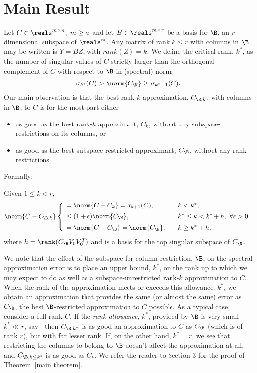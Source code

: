 \section{Main Result}
Let $C \in \reals^{m \times n}, \; m \geq n$ and let $B \in \reals^{m \times r}$ be a basis for $\B$, an $r$-dimensional subspace of $\reals^m$. Any matrix of rank $k \leq r$ with columns in $\B$ may be written is $Y = BZ$, with $rank(Z) = k$. We define the critical rank, $k^*$, as the number of singular values of $C$ strictly larger than the orthogonal complement of $C$ with respect to $\B$ in (spectral) norm:
\begin{eqnarray}\label{critical rank inequality}
\sigma_{k^*}(C) > \norm{C_{\N}} \geq \sigma_{k^*+1}(C).
\end{eqnarray}
Our main observation is that the best rank-$k$ approximation, $C_{\B, k}$, with columns in $\B$, to $C$ is for the most part either
\begin{itemize}
\item as good as the best rank-$k$ approximant, $C_k$, without any subspace-restrictions on its columns, or
\item as good as the best subspace restricted approximant, $C_{\B}$, without any rank restrictions.
\end{itemize}
Formally:
\begin{theorem}\label{main theorem}
Given $1 \leq k < r,$
\[ \norm{C - C_{\B,k}}  \left\{ \begin{array}{ll} = \norm{C - C_k} = \sigma_{k+1}(C), & \quad k < k^*,\\
[5 pt] \leq (1+\epsilon)\norm{C_{\N}}, & \quad k^* \leq k < k^*+h, \text{ } \forall \epsilon > 0 \\
[5 pt] = \norm{C - C_{\B}} = \norm{C_{\N}}, & \quad k \geq k^*+h,  \end{array} \right. \]
where $h=\rank(C_{\B} V_0V_0^T)$ 
and  is a basis for the top singular subspace of $C_{\N}$.
\end{theorem}

\noindent We note that the effect of the subspace for column-restriction, $\B$, on the spectral approximation error is to place an upper bound, $k^*$, on the rank up to which we may expect to do as well as a subspace-unrestricted rank-$k$ approximation to $C$. When the rank of the approximation meets or exceeds this allowance, $k^*$, we obtain an approximation that provides the same (or almost the same) error as $C_{\B}$, the best $\B$-restricted approximation to $C$ possible. As a typical case, consider a full rank $C$. If the \emph{rank allowance}, $k^*$, provided by $\B$ is very small - $k^* \ll r$, say - then $C_{\B,  k^*}$ is as good an approximation to $C$ as $C_{\B}$ (which is of rank $r$), but with far lesser rank. If, on the other hand, $k^* = r$, we see that restricting the columns to belong to $\B$ doesn't affect the approximation at all, and $C_{\B, k \leq k^*}$ is as good as $C_k$. We refer the reader to Section 3 for the proof of Theorem~\ref{main theorem}. 

